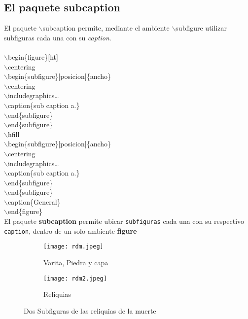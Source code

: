 \documentclass{article}
\begin{document}
	\subsection{El paquete subcaption}
	El paquete \textcolor{myGreen}{$\backslash$subcaption} permite, mediante el ambiente \textcolor{myGreen}{$\backslash$subfigure} utilizar subfiguras cada una con su \textit{caption}.\\\\\textcolor{myGreen}{$\backslash$begin}\{figure\}[ht]\\ \textcolor{myGreen}{$\backslash$centering}\\ \textcolor{myGreen}{$\backslash$begin}\{subfigure\}[posicion]\{ancho\}\\\textcolor{myGreen}{$\backslash$centering}\\\textcolor{myGreen}{$\backslash$includegraphics}\dots\\\textcolor{myGreen}{$\backslash$caption}\{sub caption a.\}\\\textcolor{myGreen}{$\backslash$end}\{subfigure\}\\\textcolor{myGreen}{$\backslash$end}\{subfigure\}\\\textcolor{myGreen}{$\backslash$hfill}\\\textcolor{myGreen}{$\backslash$begin}\{subfigure\}[posicion]\{ancho\}\\\textcolor{myGreen}{$\backslash$centering}\\\textcolor{myGreen}{$\backslash$includegraphics}\dots\\\textcolor{myGreen}{$\backslash$caption}\{sub caption a.\}\\\textcolor{myGreen}{$\backslash$end}\{subfigure\}\\\textcolor{myGreen}{$\backslash$end}\{subfigure\}\\\textcolor{myGreen}{$\backslash$caption}\{General\}\\\textcolor{myGreen}{$\backslash$end}\{figure\}\\
	El paquete \textbf{subcaption} permite ubicar \texttt{subfiguras} cada una con su respectivo \texttt{caption}, dentro de un solo ambiente \textbf{figure}
	\begin{figure}[ht]
		\centering
		\begin{subfigure}[t]{0.475\textwidth}
			\centering
			\texttt{[image: rdm.jpeg]}
			\caption{Varita, Piedra y capa}
		\end{subfigure}
		\hfill	%
		\begin{subfigure}[t]{0.475\textwidth}
			\centering
			\texttt{[image: rdm2.jpeg]}
			\caption{Reliquias }
		\end{subfigure}
		\caption{Dos Subfiguras de las reliquias de la muerte}
	\end{figure}
\end{document}
